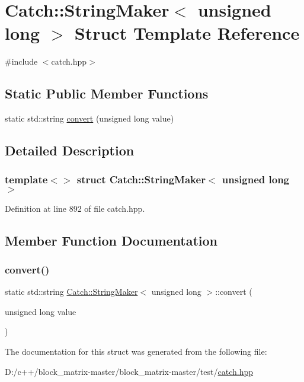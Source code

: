 \hypertarget{struct_catch_1_1_string_maker_3_01unsigned_01long_01_4}{}\section{Catch\+:\+:String\+Maker$<$ unsigned long $>$ Struct Template Reference}
\label{struct_catch_1_1_string_maker_3_01unsigned_01long_01_4}


{\ttfamily \#include $<$catch.\+hpp$>$}

\subsection*{Static Public Member Functions}
\begin{DoxyCompactItemize}
\item 
static std\+::string \mbox{\hyperlink{struct_catch_1_1_string_maker_3_01unsigned_01long_01_4_ae105dc97e4462a86a61b59667f8423c9}{convert}} (unsigned long value)
\end{DoxyCompactItemize}


\subsection{Detailed Description}
\subsubsection*{template$<$$>$\newline
struct Catch\+::\+String\+Maker$<$ unsigned long $>$}



Definition at line 892 of file catch.\+hpp.



\subsection{Member Function Documentation}
\mbox{\label{struct_catch_1_1_string_maker_3_01unsigned_01long_01_4_ae105dc97e4462a86a61b59667f8423c9}} 
\subsubsection{\texorpdfstring{convert()}{convert()}}
{\footnotesize\ttfamily static std\+::string \mbox{\hyperlink{struct_catch_1_1_string_maker}{Catch\+::\+String\+Maker}}$<$ unsigned long $>$\+::convert (\begin{DoxyParamCaption}\item[{unsigned long}]{value }\end{DoxyParamCaption})\hspace{0.3cm}{\ttfamily [static]}}



The documentation for this struct was generated from the following file\+:\begin{DoxyCompactItemize}
\item 
D\+:/c++/block\+\_\+matrix-\/master/block\+\_\+matrix-\/master/test/\mbox{\hyperlink{catch_8hpp}{catch.\+hpp}}\end{DoxyCompactItemize}

